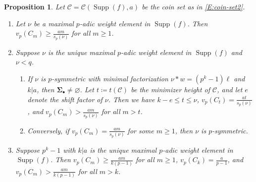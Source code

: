 \documentclass{amsart}
\numberwithin{equation}{section}
\newcommand{\bSig}{\mathbf\Sigma}
\newcommand{\Sb}{\bSig_\bullet}
\newcommand{\cC}{\mathcal{C}}
\DeclareMathOperator{\Supp}{Supp}
\theoremstyle{plain}
\newtheorem{proposition}[theorem]{Proposition}
\theoremstyle{definition}
\begin{document}
\begin{proposition}\label{P:bound}
Let $\cC=\cC(\Supp(f),a)$ be the coin set as in \eqref{E:coin-set2}. 
\begin{enumerate}
\item 
Let $\nu$ be a maximal $p$-adic weight element in $\Supp(f)$. Then     
$
        v_p(C_m) \ge \frac{am}{s_p(\nu)}
    $ for all $m\ge 1$.   
\item 
Suppose $\nu$ is the unique maximal $p$-adic weight element in $\Supp(f)$ and $\nu<q$.
\begin{enumerate}
\item If $\nu$ is $p$-symmetric with minimal factorization
    $\nu * w = (p^k-1)\ell$ and $k|a$,
then $\Sb\neq \varnothing$.
Let $t \coloneqq t(\cC)$
be the minimizer height of $\cC$,
and let $e$ denote the shift factor of $\nu$.
Then we have $k-e\le t\le \nu$, $v_p(C_t)=\frac{at}{s_p(\nu)}$, and 
$v_p(C_m)>\frac{am}{s_p(\nu)}$ for all $m>t$.
\item 
Conversely, if $v_p(C_m)=\frac{am}{s_p(\nu)}$ for some $m\ge 1$, then 
$\nu$ is $p$-symmetric.    
\end{enumerate}
\item Suppose $p^k-1$ with $k|a$ is the unique maximal $p$-adic weight element in $\Supp(f)$.
Then $v_p(C_m) \ge \frac{am}{k(p-1)}$ for all $m\ge 1$,
$v_p(C_k)=\frac{a}{p-1}$, 
and $v_p(C_m)>\frac{am}{k(p-1)}$ for all $m>k$.
\end{enumerate}
\end{proposition}
\end{document}
